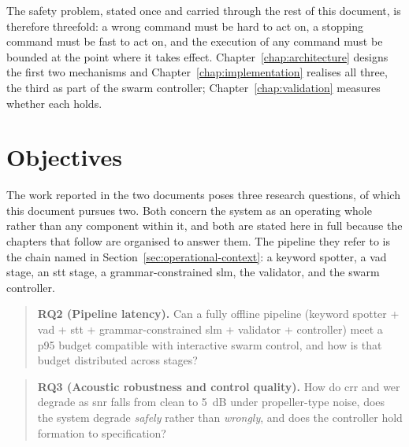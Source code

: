The safety problem, stated once and carried through the rest of this document, is therefore
threefold: a wrong command must be hard to act on, a stopping command must be fast to act on, and
the execution of any command must be bounded at the point where it takes effect.
Chapter~\ref{chap:architecture} designs the first two mechanisms and
Chapter~\ref{chap:implementation} realises all three, the third as part of the swarm controller;
Chapter~\ref{chap:validation} measures whether each holds.

\section{Objectives}
\label{sec:objectives}
The work reported in the two documents poses three research questions, of which this document
pursues two. Both concern the system as an operating whole rather than any component within it,
and both are stated here in full because the chapters that follow are organised to answer them.
The pipeline they refer to is the chain named in Section~\ref{sec:operational-context}: a keyword
spotter, a \gls{vad} stage, an \gls{stt} stage, a grammar-constrained \gls{slm}, the validator,
and the swarm controller.

\begin{quote}
\textbf{RQ2 (Pipeline latency).} Can a fully offline pipeline (keyword spotter + \gls{vad} +
\gls{stt} + grammar-constrained \gls{slm} + validator + controller) meet a p95 budget compatible
with interactive swarm control, and how is that budget distributed across stages?
\end{quote}

\begin{quote}
\textbf{RQ3 (Acoustic robustness and control quality).} How do \acrlong{crr} and \acrlong{wer}
degrade as \gls{snr} falls from clean to 5~dB under propeller-type noise, does the system degrade
\emph{safely} rather than \emph{wrongly}, and does the controller hold formation to specification?
\end{quote}

